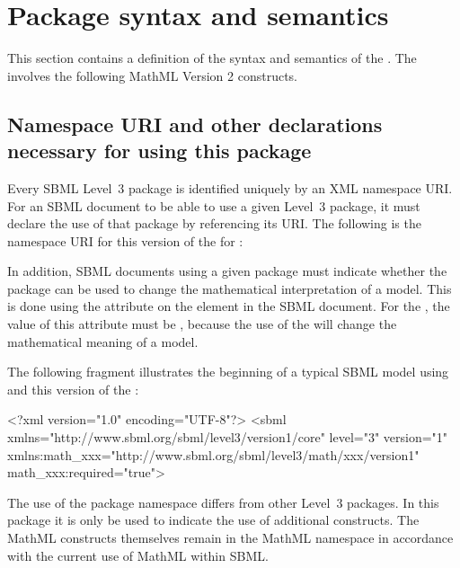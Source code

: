 
\section{Package syntax and semantics}
\label{sec:syntax}

This section contains a definition of the syntax and semantics of the \sbmlthreepkg.  The \ThisPackage involves the following MathML Version 2 \cite{w3c:2000b} constructs.


\subsection{Namespace URI and other declarations necessary for using this package}
\label{xml-namespace}

Every SBML Level~3 package is identified uniquely by an XML namespace URI.  For an SBML document to be able to use a given Level~3 package, it must declare the use of that package by referencing its URI.  The following is the namespace URI for this version of the \ThisPackage for \sbmlthreecorenoversion:
\begin{center}
\PackageURL
\end{center}

In addition, SBML documents using a given package must indicate whether the package can be used to change the mathematical interpretation of a model.  This is done using the attribute  on the  element in the SBML document.  For the \ThisPackage, the value of this attribute must be , because the use of the \ThisPackage will change the mathematical meaning of a model.

The following fragment illustrates the beginning of a typical SBML model using \sbmlthreecore and this version of the \ThisPackage:


\begin{example}
<?xml version="1.0" encoding="UTF-8"?>
<sbml xmlns="http://www.sbml.org/sbml/level3/version1/core" level="3" version="1"
      xmlns:math_xxx="http://www.sbml.org/sbml/level3/math/xxx/version1"
      math_xxx:required="true">
\end{example}

The use of the package namespace differs from other Level~3 packages. In this package it is only be used to indicate the use of additional constructs. The MathML constructs themselves remain in the MathML namespace in accordance with the current use of MathML within SBML. 


